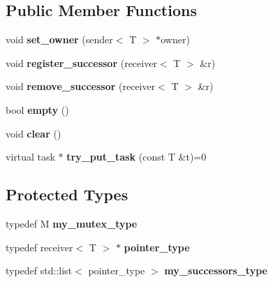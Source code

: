 \subsection*{Public Member Functions}
\begin{DoxyCompactItemize}
\item 
\hypertarget{classinternal_1_1successor__cache_a974175c5639f94a7b57a2252b1623638}{}void {\bfseries set\+\_\+owner} (sender$<$ T $>$ $\ast$owner)\label{classinternal_1_1successor__cache_a974175c5639f94a7b57a2252b1623638}

\item 
\hypertarget{classinternal_1_1successor__cache_a9049807304fce490951d99945d6efc2f}{}void {\bfseries register\+\_\+successor} (receiver$<$ T $>$ \&r)\label{classinternal_1_1successor__cache_a9049807304fce490951d99945d6efc2f}

\item 
\hypertarget{classinternal_1_1successor__cache_af650b5673bad38008e1b81025999b752}{}void {\bfseries remove\+\_\+successor} (receiver$<$ T $>$ \&r)\label{classinternal_1_1successor__cache_af650b5673bad38008e1b81025999b752}

\item 
\hypertarget{classinternal_1_1successor__cache_ad8d68ac73eab5664ea6d1828eabab01a}{}bool {\bfseries empty} ()\label{classinternal_1_1successor__cache_ad8d68ac73eab5664ea6d1828eabab01a}

\item 
\hypertarget{classinternal_1_1successor__cache_a2a255683901a7e2b906bb7bf993efd3b}{}void {\bfseries clear} ()\label{classinternal_1_1successor__cache_a2a255683901a7e2b906bb7bf993efd3b}

\item 
\hypertarget{classinternal_1_1successor__cache_a93bb30d47c80702ad37455c8aaf7f346}{}virtual task $\ast$ {\bfseries try\+\_\+put\+\_\+task} (const T \&t)=0\label{classinternal_1_1successor__cache_a93bb30d47c80702ad37455c8aaf7f346}

\end{DoxyCompactItemize}
\subsection*{Protected Types}
\begin{DoxyCompactItemize}
\item 
\hypertarget{classinternal_1_1successor__cache_ab46c5d25a36903bb97dbd0450eaa9495}{}typedef M {\bfseries my\+\_\+mutex\+\_\+type}\label{classinternal_1_1successor__cache_ab46c5d25a36903bb97dbd0450eaa9495}

\item 
\hypertarget{classinternal_1_1successor__cache_a3053a64a1c19be55d20c44c729244e46}{}typedef receiver$<$ T $>$ $\ast$ {\bfseries pointer\+\_\+type}\label{classinternal_1_1successor__cache_a3053a64a1c19be55d20c44c729244e46}

\item 
\hypertarget{classinternal_1_1successor__cache_af39288ec23c78d9f3c5dd9ca42d156dc}{}typedef std\+::list$<$ pointer\+\_\+type $>$ {\bfseries my\+\_\+successors\+\_\+type}\label{classinternal_1_1successor__cache_af39288ec23c78d9f3c5dd9ca42d156dc}

\end{DoxyCompactItemize}
